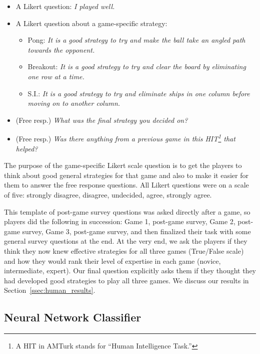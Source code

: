 \documentclass[letterpaper, 10 pt, conference]{ieeeconf}  %
\begin{document}
\begin{itemize}
    \item A Likert question: \emph{I played well.}
    \item A Likert question about a game-specific strategy:
    \begin{itemize}
        \item Pong: \emph{It is a good strategy to try and make the ball take an angled path towards the opponent.}
        \item Breakout: \emph{It is a good strategy to try and clear the board by eliminating one row at a time.}
        \item S.I.: \emph{It is a good strategy to try and eliminate ships in one column before moving on to another column.}
    \end{itemize}
    \item (Free resp.) \emph{What was the final strategy you decided on?}
    \item (Free resp.) \emph{Was there anything from a previous game in this HIT\footnote{A HIT in AMTurk stands
    for ``Human Intelligence Task.''} that helped?}
\end{itemize}

The purpose of the game-specific Likert scale question is to get the players to think about good
general strategies for that game and also to make it easier for them to answer the free response
questions. All Likert questions were on a scale of five: strongly disagree, disagree, undecided,
agree, strongly agree.

This template of post-game survey questions was asked directly after a game, so players did the
following in succession: Game 1, post-game survey, Game 2, post-game survey, Game 3, post-game
survey, and then finalized their task with some general survey questions at the end. At the very
end, we ask the players if they think they now knew effective strategies for all three games
(True/False scale) and how they would rank their level of expertise in each game (novice,
intermediate, expert).  Our final question explicitly asks them if they thought they had developed
good strategies to play all three games. We discuss our results in Section~\ref{ssec:human_results}.

\subsection{Neural Network Classifier}\label{ssec:nn_experiment}
\end{document}
